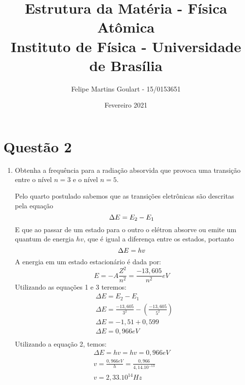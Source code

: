 \documentclass[a4paper]{article}
\title{%
  Estrutura da Matéria - Física Atômica \\
  \large Instituto de Física - Universidade de Brasília}
\author{Felipe Martins Goulart - 15/0153651}
\date{Fevereiro 2021}
\begin{document}
\maketitle
 \renewcommand{\theenumi}{\alph{enumi}}
\section {Questão 2}
 \begin{enumerate}
    \item
        Obtenha a frequência para a radiação absorvida que provoca uma transição entre o nível $n=3$ e o nível $n=5$.
            \begin{itemize}
                Pelo quarto postulado sabemos que as transições eletrônicas são descritas pela equação
                    \begin{equation}
                        {\Delta{E} = E_2 - E_1}\\
                    \end{equation}
                E que ao passar de um estado para o outro o elétron absorve ou emite um quantum de energia $hv$, que é igual a diferença entre os estados, portanto
                    \begin{equation}
                        {\Delta{E} = hv}\\
                    \end{equation}
                A energia em um estado estacionário é dada por: 
                    \begin{equation}
                        {{E} = -A\frac{Z^2}{n^2} = \frac{-13,605}{n^2} eV}
                    \end{equation}
                Utilizando as equações 1 e 3 teremos:
                    \begin{equation}
                        \begin{aligned}
                            &\Delta{E} =  E_2 - E_1\\
                            &\Delta{E} =  \frac{-13,605}{3^2} - (\frac{-13,605}{5^2}) \\
                            &\Delta{E} =  -1,51 + 0,599\\
                            &\Delta{E} =  0,966 eV\\
                        \end{aligned}
                    \end{equation}
                Utilizando a equação 2, temos:
                    \begin{equation}
                        \begin{aligned}
                             {\Delta{E} = hv = hv = 0,966 eV}\\
                             {v = \frac{0,966eV}{h} = \frac{0,966}{4,14.10^{-13}}}\\
                             {v = 2,33.10^{14}Hz}\\
                        \end{aligned}     
                    \end{equation}


\end{itemize}
\end{enumerate}
\end{document}
